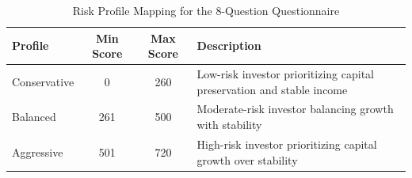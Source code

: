 \begin{table}[H]
\centering
\begin{tabular}{lccp{7.2cm}}
\toprule
\textbf{Profile} & \textbf{Min Score} & \textbf{Max Score} & \textbf{Description} \\
\midrule
Conservative & 0 & 260 & Low-risk investor prioritizing capital preservation and stable income \\
Balanced & 261 & 500 & Moderate-risk investor balancing growth with stability \\
Aggressive & 501 & 720 & High-risk investor prioritizing capital growth over stability \\
\bottomrule
\end{tabular}
\caption{Risk Profile Mapping for the 8-Question Questionnaire}
\label{tab:appendix-risk-thresholds}
\end{table}
